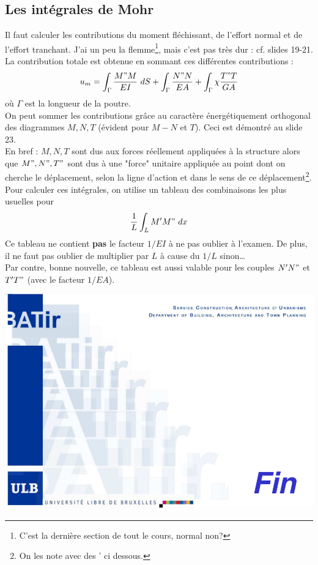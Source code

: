 	\newpage
	\subsection{Les intégrales de Mohr}
	Il faut calculer les contributions du moment fléchissant, de l'effort 
	normal et de l'effort tranchant. J'ai un peu la flemme\footnote{C'est la 
	dernière section de tout le cours, normal non?}, mais c'est pas 
	très dur : cf. slides 19-21.\\
	La contribution totale est obtenue en sommant ces différentes 
	contributions :
	\begin{equation}
	u_m = \int_{\Gamma} \dfrac{M"M}{EI}\ dS + \int_\Gamma \dfrac{N"N}{EA} + 
	\int_\Gamma	\chi\dfrac{T"T}{GA}
	\end{equation}
	où $\Gamma$ est la longueur de la poutre.\\
	\danger On peut sommer les contributions grâce au caractère 
	énergétiquement orthogonal des diagrammes $M, N, T$ (évident pour $M-N$ 
	et $T$). Ceci est démontré au slide 23.\\
	
	En bref : $M,N,T$ sont dus aux forces réellement appliquées à la structure 
	alors que $M", N", T"$ sont dus à une "force" unitaire appliquée au point 
	dont on cherche le déplacement, selon la ligne d'action et dans le sens de 
	ce déplacement\footnote{\danger On les note avec des ' ci dessous.}.\\
	
	Pour calculer ces intégrales, on utilise un tableau des combinaisons les 
	plus usuelles pour 
	\begin{equation}
	\dfrac{1}{L}\int_L M'M"\ dx
	\end{equation}
	\danger Ce tableau ne contient \textbf{pas} le facteur $1/EI$ à ne pas 
	oublier à l'examen. De plus, il ne faut pas oublier de multiplier par 
	$L$ à cause du $1/L$ sinon\dots\\
	
	Par contre, bonne nouvelle, ce tableau est aussi valable pour les couples 
	$N'N"$ et $T'T"$ (\danger avec le facteur $1/EA$).
	\begin{center}
	\includegraphics[scale=0.4]{ch8/image3}
	\end{center}
		